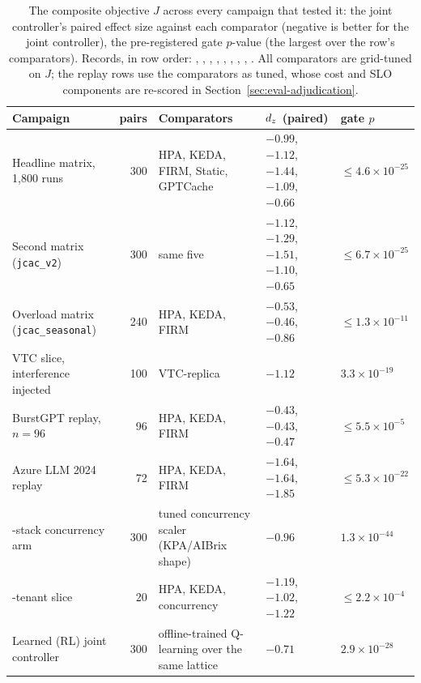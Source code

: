 \begin{table}[htbp]
\centering\tablefontsmall\setlength{\tabcolsep}{4pt}
\begin{tabularx}{\textwidth}{@{}>{\raggedright\arraybackslash}p{}r>{\raggedright\arraybackslash}X>{\raggedright\arraybackslash}p{}l@{}}
\toprule
\textbf{Campaign} & \textbf{pairs} & \textbf{Comparators} & $d_z$ \textbf{(paired)} & \textbf{gate} $p$ \\
\midrule
Headline matrix, 1,800 runs & 300 & HPA, KEDA, FIRM, Static, GPTCache & $-0.99$, $-1.12$, $-1.44$, $-1.09$, $-0.66$ & $\le 4.6{\times}10^{-25}$ \\
Second matrix (\texttt{jcac\_v2}) & 300 & same five & $-1.12$, $-1.29$, $-1.51$, $-1.10$, $-0.65$ & $\le 6.7{\times}10^{-25}$ \\
Overload matrix (\texttt{jcac\_seasonal}) & 240 & HPA, KEDA, FIRM & $-0.53$, $-0.46$, $-0.86$ & $\le 1.3{\times}10^{-11}$ \\
VTC slice, interference injected & 100 & VTC-replica & $-1.12$ & $3.3{\times}10^{-19}$ \\
BurstGPT replay, $n = 96$ & 96 & HPA, KEDA, FIRM & $-0.43$, $-0.43$, $-0.47$ & $\le 5.5{\times}10^{-5}$ \\
Azure LLM 2024 replay & 72 & HPA, KEDA, FIRM & $-1.64$, $-1.64$, $-1.85$ & $\le 5.3{\times}10^{-22}$ \\
2026-stack concurrency arm & 300 & tuned concurrency scaler (KPA/AIBrix shape) & $-0.96$ & $1.3{\times}10^{-44}$ \\
32-tenant slice & 20 & HPA, KEDA, concurrency & $-1.19$, $-1.02$, $-1.22$ & $\le 2.2{\times}10^{-4}$ \\
Learned (RL) joint controller & 300 & offline-trained Q-learning over the same lattice & $-0.71$ & $2.9{\times}10^{-28}$ \\
\bottomrule
\end{tabularx}
\caption{The composite objective $J$ across every campaign that tested
it: the joint controller's paired effect size against each comparator
(negative is better for the joint controller), the pre-registered gate
$p$-value (the largest over the row's comparators). Records, in row order:
, , ,
, ,
, ,
, . All
comparators are grid-tuned on $J$; the replay rows use the comparators as
tuned, whose cost and SLO components are re-scored in
Section~\ref{sec:eval-adjudication}.}
\label{tab:composite-campaigns}
\end{table}

